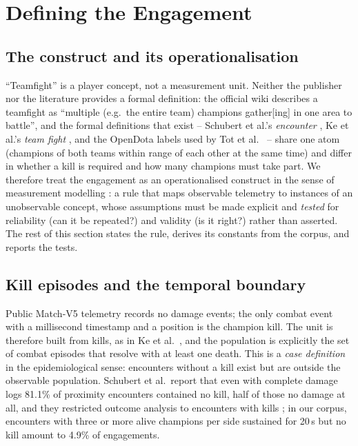 
\section{Defining the Engagement}\label{sec:definition}

\subsection{The construct and its operationalisation}

``Teamfight'' is a player concept, not a measurement unit. Neither the publisher nor the
literature provides a formal definition: the official wiki describes a teamfight as
``multiple (e.g.\ the entire team) champions gather[ing] in one area to battle'', and the
formal definitions that exist -- Schubert et al.'s \emph{encounter}
\cite{schubert2016encounter}, Ke et al.'s \emph{team fight} \cite{ke2022}, and the
OpenDota labels used by Tot et al.\ \cite{tot2021camera} -- share one atom (champions of
both teams within range of each other at the same time) and differ in whether a kill is
required and how many champions must take part. We therefore treat the engagement as an
operationalised construct in the sense of measurement modelling
\cite{jacobs2021measurement}: a rule that maps observable telemetry to instances of an
unobservable concept, whose assumptions must be made explicit and \emph{tested} for
reliability (can it be repeated?) and validity (is it right?) rather than asserted. The
rest of this section states the rule, derives its constants from the corpus, and reports
the tests.

\subsection{Kill episodes and the temporal boundary}

Public Match-V5 telemetry \cite{riotapi2024timeline} records no damage events; the only
combat event with a millisecond timestamp and a position is the champion kill. The unit is
therefore built from kills, as in Ke et al.\ \cite{ke2022}, and the population is
explicitly the set of combat episodes that resolve with at least one death. This is a
\emph{case definition} in the epidemiological sense: encounters without a kill exist but
are outside the observable population. Schubert et al.\ report that even with complete
damage logs 81.1\% of proximity encounters contained no kill, half of those no damage at
all, and they restricted outcome analysis to encounters with kills
\cite{schubert2016encounter}; in our corpus, encounters with three or more alive champions
per side sustained for 20\,s but no kill amount to 4.9\% of engagements.


